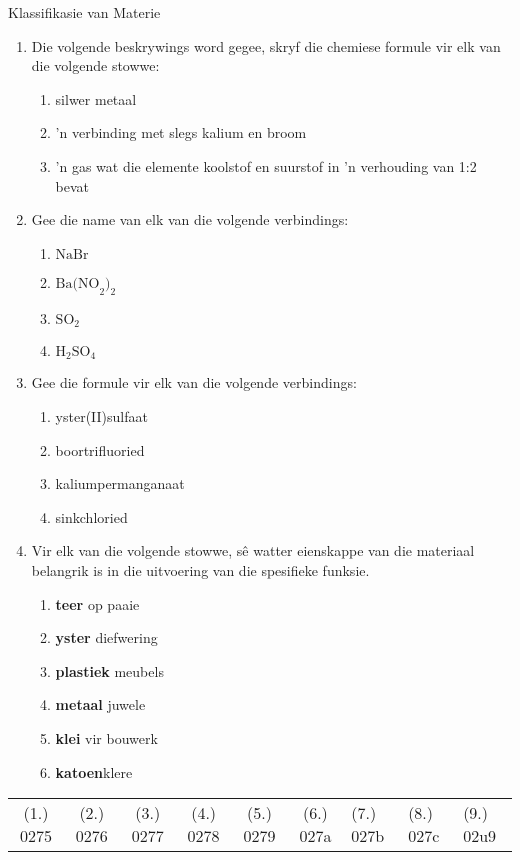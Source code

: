 \begin{eocexercises}{Klassifikasie van Materie}
{\begin{enumerate}[noitemsep, label=\textbf{\arabic*}. ]
\begin{enumerate}[noitemsep, label=\textbf{\alph*}. ]
\end{enumerate}
\item Die volgende beskrywings word gegee, skryf die chemiese formule vir elk van die volgende stowwe:
\begin{enumerate}[noitemsep, label=\textbf{\alph*}. ] 
\item silwer metaal
\item 'n verbinding met slegs kalium en broom
\item 'n gas wat die elemente koolstof en suurstof in 'n verhouding van 1:2 bevat
\end{enumerate}
\item Gee die name van elk van die volgende verbindings:
\begin{enumerate}[noitemsep, label=\textbf{\alph*}. ] 
\item $\text{NaBr}$
\item ${\text{Ba}(\text{NO}}_{2})_2$
\item ${\text{SO}}_{2}$ 
\item $\text{H}_{2}\text{SO}_{4}$
\end{enumerate}
\item Gee die formule vir elk van die volgende verbindings:
\begin{enumerate}[noitemsep, label=\textbf{\alph*}.]
\item yster(II)sulfaat
\item boortrifluoried
\item kaliumpermanganaat
\item sinkchloried
\end{enumerate}

\item Vir elk van die volgende stowwe, sê watter eienskappe van die materiaal belangrik is in die uitvoering van die spesifieke funksie.
\begin{enumerate}[noitemsep, label=\textbf{\alph*}. ] 
\item \textbf{teer} op paaie
\item \textbf{yster} diefwering
\item \textbf{plastiek} meubels
\item \textbf{metaal} juwele
\item \textbf{klei} vir bouwerk
\item \textbf{katoen}klere
\end{enumerate}
\end{enumerate}

\practiceinfo
\begin{tabular}[h]{cccccc}
 (1.) 0275  &  (2.) 0276  &  (3.) 0277  &  (4.) 0278  &  (5.) 0279  &  (6.) 027a  &  (7.) 027b  &  (8.) 027c  & (9.) 02u9 &
\end{tabular}
}
\end{eocexercises}
